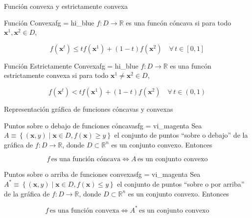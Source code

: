 \documentclass[10pt,aspectratio=169]{beamer}  %
\begin{document}
\begin{frame}{Función convexa y estrictamente convexa}

	\begin{varblock}{Función Convexa}{fg = hi_blue}
		$f: D \rightarrow \mathbb{R}$ es una funcón cóncava si para todo $\mathbf{x}^1, \mathbf{x}^2 \in D$,
		
		\[ f(\mathbf{x}^t) \leq t f(\mathbf{x}^1) + (1 - t) f(\mathbf{x}^2)   \quad   \forall \, t \in [0,1] \]
	\end{varblock}

	\begin{varblock}{Función Estrictamente Convexa}{fg = hi_blue}
		$f: D \rightarrow \mathbb{R}$ es una funcón estrictamente convexa si para todo $\mathbf{x}^1 \neq  \mathbf{x}^2 \in D$,
		
		\[ f(\mathbf{x}^t) < t f(\mathbf{x}^1) + (1 - t) f(\mathbf{x}^2)   \quad   \forall \, t \in (0,1) \]
	\end{varblock}

\end{frame}


\begin{frame}{Representación gráfica de funciones cóncavas y convexas}
	\begin{varblock}{Puntos sobre o debajo de funciones cóncavas}{fg = vi_magenta}
		Sea $A \equiv \left\{ (\mathbf{x}, y) \mid \mathbf{x} \in D, f(\mathbf{x}) \geq y\right\}$ el conjunto de puntos
		``sobre o debajo'' de la gráfica de $f: D \rightarrow \mathbb{R}$, donde $D \subset \mathbb{R}^n$ es un conjunto
		convexo. Entonces
		
		\[ f \, \text{es una función cóncava}  \Longleftrightarrow  A \, \text{es un conjunto convexo}\]
		
	\end{varblock}

	\begin{varblock}{Puntos sobre o arriba de funciones convexas}{fg = vi_magenta}
		Sea $A^* \equiv \left\{ (\mathbf{x}, y) \mid \mathbf{x} \in D, f(\mathbf{x}) \leq y\right\}$ el conjunto de puntos
		``sobre o por arriba'' de la gráfica de $f: D \rightarrow \mathbb{R}$, donde $D \subset \mathbb{R}^n$ es un conjunto
		convexo. Entonces
		
		\[ f \, \text{es una función convexa}  \Longleftrightarrow  A^* \, \text{es un conjunto convexo}\]
		
	\end{varblock}
\end{frame}
\end{document}
